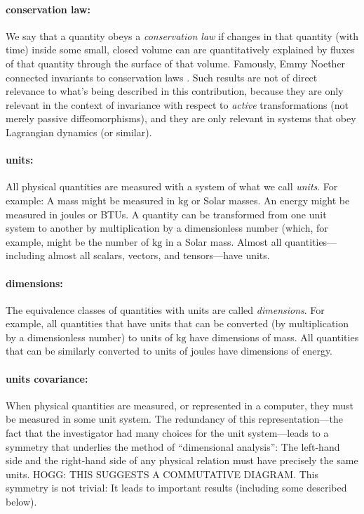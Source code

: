 \documentclass{article}
\newcommand{\unit}[1]{\mathrm{#1}}
\newcommand{\kg}{\unit{kg}}
\begin{document}
\paragraph{conservation law:}
We say that a quantity obeys a \emph{conservation law} if changes in that quantity (with time) inside some small, closed volume can are quantitatively explained by fluxes of that quantity through the surface of that volume.
Famously, Emmy Noether connected invariants to conservation laws \cite{noether}.
Such results are not of direct relevance to what's being described in this contribution, because they are only relevant in the context of invariance with respect to \emph{active} transformations (not merely passive diffeomorphisms), and they are only relevant in systems that obey Lagrangian dynamics (or similar).

\paragraph{units:} All physical quantities are measured with a system of what we call \emph{units}.
For example: A mass might be measured in $\kg$ or Solar masses.
An energy might be measured in joules or BTUs.
A quantity can be transformed from one unit system to another by multiplication by a dimensionless number (which, for example, might be the number of $\kg$ in a Solar mass.
Almost all quantities---including almost all scalars, vectors, and tensors---have units.

\paragraph{dimensions:} The equivalence classes of quantities with units are called \emph{dimensions}.
For example, all quantities that have units that can be converted (by multiplication by a dimensionless number) to units of $\kg$ have dimensions of mass.
All quantities that can be similarly converted to units of joules have dimensions of energy.

\paragraph{units covariance:} When physical quantities are measured, or represented in a computer, they must be measured in some unit system.
The redundancy of this representation---the fact that the investigator had many choices for the unit system---leads to a symmetry that underlies the method of ``dimensional analysis'':
The left-hand side and the right-hand side of any physical relation must have precisely the same units.
HOGG: THIS SUGGESTS A COMMUTATIVE DIAGRAM.
This symmetry is not trivial: It leads to important results (including some described below).
\end{document}
